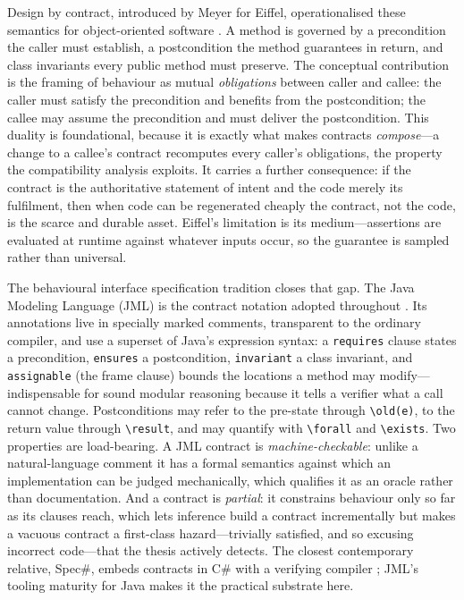 Design by contract, introduced by Meyer for Eiffel, operationalised these
semantics for object-oriented software \cite{meyer1992dbc,meyer1997oosc}. A method
is governed by a precondition the caller must establish, a postcondition the method
guarantees in return, and class invariants every public method must preserve. The
conceptual contribution is the framing of behaviour as mutual \emph{obligations}
between caller and callee: the caller must satisfy the precondition and benefits
from the postcondition; the callee may assume the precondition and must deliver the
postcondition. This duality is foundational, because it is exactly what makes
contracts \emph{compose}---a change to a callee's contract recomputes every
caller's obligations, the property the compatibility analysis exploits. It carries
a further consequence: if the contract is the authoritative statement of intent and
the code merely its fulfilment, then when code can be regenerated cheaply the
contract, not the code, is the scarce and durable asset. Eiffel's limitation is its
medium---assertions are evaluated at runtime against whatever inputs occur, so the
guarantee is sampled rather than universal.

The behavioural interface specification tradition closes that gap. The Java
Modeling Language (JML) is the contract notation adopted throughout
\cite{leavens2006jml}. Its annotations live in specially marked comments,
transparent to the ordinary compiler, and use a superset of Java's expression
syntax: a \texttt{requires} clause states a precondition, \texttt{ensures} a
postcondition, \texttt{invariant} a class invariant, and \texttt{assignable} (the
frame clause) bounds the locations a method may modify---indispensable for sound
modular reasoning because it tells a verifier what a call cannot change.
Postconditions may refer to the pre-state through \verb|\old(e)|, to the return
value through \verb|\result|, and may quantify with \verb|\forall| and
\verb|\exists|. Two properties are load-bearing. A JML contract is
\emph{machine-checkable}: unlike a natural-language comment it has a formal
semantics against which an implementation can be judged mechanically, which
qualifies it as an oracle rather than documentation. And a contract is
\emph{partial}: it constrains behaviour only so far as its clauses reach, which lets
inference build a contract incrementally but makes a vacuous contract a first-class
hazard---trivially satisfied, and so excusing incorrect code---that the thesis
actively detects. The closest contemporary relative, Spec\#, embeds contracts in
C\# with a verifying compiler \cite{barnett2005specsharp}; JML's tooling maturity
for Java makes it the practical substrate here.

